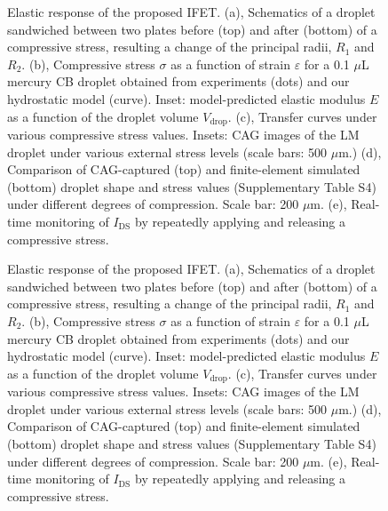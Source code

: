 \begin{figure}[htbp]
  \centering
  \caption{\label{fig:small-main-4}
Elastic response of the proposed IFET. (a), Schematics of a droplet sandwiched between two plates before (top) and after (bottom) of a compressive stress, resulting a change of the principal radii, \(R_{1}\) and \(R_{2}\). (b), Compressive stress \(\sigma\) as a function of strain \(\varepsilon\) for a 0.1 \(\mu\)L mercury CB droplet obtained from experiments (dots) and our hydrostatic model (curve). Inset: model-predicted elastic modulus \(E\) as a function of the droplet volume \(V_{\mathrm{drop}}\). (c), Transfer curves under various compressive stress values. Insets: CAG images of the LM droplet under various external stress levels (scale bars: 500 \(\mu\)m.) (d), Comparison of CAG-captured (top) and finite-element simulated (bottom) droplet shape and stress values (Supplementary Table S4) under different degrees of compression. Scale bar: 200 \(\mu\)m. (e), Real-time monitoring of \(I_{\mathrm{DS}}\) by repeatedly applying and releasing a compressive stress.}
\end{figure}

\begin{figure}[htbp]
  \centering
  \caption{\label{fig:small-main-4}
Elastic response of the proposed IFET. (a), Schematics of a droplet sandwiched between two plates before (top) and after (bottom) of a compressive stress, resulting a change of the principal radii, \(R_{1}\) and \(R_{2}\). (b), Compressive stress \(\sigma\) as a function of strain \(\varepsilon\) for a 0.1 \(\mu\)L mercury CB droplet obtained from experiments (dots) and our hydrostatic model (curve). Inset: model-predicted elastic modulus \(E\) as a function of the droplet volume \(V_{\mathrm{drop}}\). (c), Transfer curves under various compressive stress values. Insets: CAG images of the LM droplet under various external stress levels (scale bars: 500 \(\mu\)m.) (d), Comparison of CAG-captured (top) and finite-element simulated (bottom) droplet shape and stress values (Supplementary Table S4) under different degrees of compression. Scale bar: 200 \(\mu\)m. (e), Real-time monitoring of \(I_{\mathrm{DS}}\) by repeatedly applying and releasing a compressive stress.}
\end{figure}


